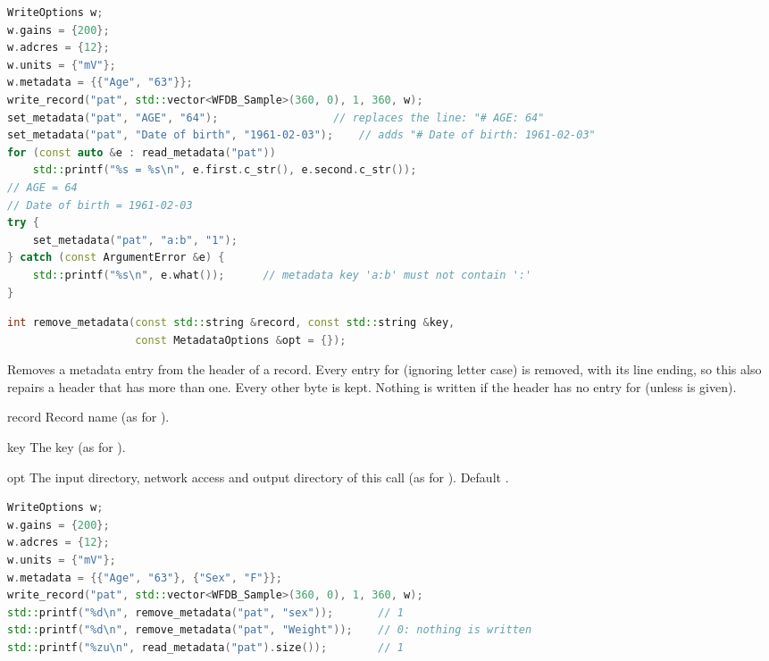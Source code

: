\begin{lstlisting}[language=C++,style=example]
WriteOptions w;
w.gains = {200};
w.adcres = {12};
w.units = {"mV"};
w.metadata = {{"Age", "63"}};
write_record("pat", std::vector<WFDB_Sample>(360, 0), 1, 360, w);
set_metadata("pat", "AGE", "64");                  // replaces the line: "# AGE: 64"
set_metadata("pat", "Date of birth", "1961-02-03");    // adds "# Date of birth: 1961-02-03"
for (const auto &e : read_metadata("pat"))
    std::printf("%s = %s\n", e.first.c_str(), e.second.c_str());
// AGE = 64
// Date of birth = 1961-02-03
try {
    set_metadata("pat", "a:b", "1");
} catch (const ArgumentError &e) {
    std::printf("%s\n", e.what());      // metadata key 'a:b' must not contain ':'
}
\end{lstlisting}

\begin{lstlisting}[language=C++,style=signature]
int remove_metadata(const std::string &record, const std::string &key,
                    const MetadataOptions &opt = {});
\end{lstlisting}
Removes a metadata entry from the header of a record. Every entry for 
(ignoring letter case) is removed, with its line ending, so this also repairs a header
that has more than one. Every other byte is kept. Nothing is written if the header has no
entry for  (unless  is given).
\begin{params}
\item[record] Record name (as for ).
\item[key] The key (as for ).
\item[opt] The input directory, network access and output directory  of this
  call (as for ). Default \code{\{\}}.
\end{params}
\begin{lstlisting}[language=C++,style=example]
WriteOptions w;
w.gains = {200};
w.adcres = {12};
w.units = {"mV"};
w.metadata = {{"Age", "63"}, {"Sex", "F"}};
write_record("pat", std::vector<WFDB_Sample>(360, 0), 1, 360, w);
std::printf("%d\n", remove_metadata("pat", "sex"));       // 1
std::printf("%d\n", remove_metadata("pat", "Weight"));    // 0: nothing is written
std::printf("%zu\n", read_metadata("pat").size());        // 1
\end{lstlisting}


